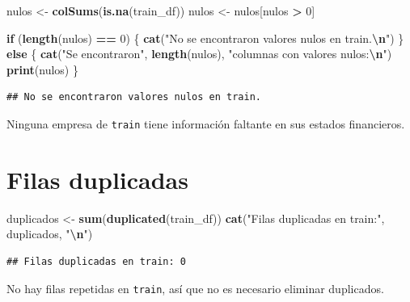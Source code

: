 \documentclass[
]{book}
\newenvironment{Shaded}{\begin{snugshade}}{\end{snugshade}}
\newcommand{\ControlFlowTok}[1]{\textcolor[rgb]{0.13,0.29,0.53}{\textbf{#1}}}
\newcommand{\DecValTok}[1]{\textcolor[rgb]{0.00,0.00,0.81}{#1}}
\newcommand{\FunctionTok}[1]{\textcolor[rgb]{0.13,0.29,0.53}{\textbf{#1}}}
\newcommand{\NormalTok}[1]{#1}
\newcommand{\OtherTok}[1]{\textcolor[rgb]{0.56,0.35,0.01}{#1}}
\newcommand{\SpecialCharTok}[1]{\textcolor[rgb]{0.81,0.36,0.00}{\textbf{#1}}}
\newcommand{\StringTok}[1]{\textcolor[rgb]{0.31,0.60,0.02}{#1}}
\begin{document}
\begin{Shaded}
\begin{Highlighting}[]
\NormalTok{nulos }\OtherTok{\textless{}{-}} \FunctionTok{colSums}\NormalTok{(}\FunctionTok{is.na}\NormalTok{(train\_df))}
\NormalTok{nulos }\OtherTok{\textless{}{-}}\NormalTok{ nulos[nulos }\SpecialCharTok{\textgreater{}} \DecValTok{0}\NormalTok{]}

\ControlFlowTok{if}\NormalTok{ (}\FunctionTok{length}\NormalTok{(nulos) }\SpecialCharTok{==} \DecValTok{0}\NormalTok{) \{}
  \FunctionTok{cat}\NormalTok{(}\StringTok{"No se encontraron valores nulos en train.}\SpecialCharTok{\textbackslash{}n}\StringTok{"}\NormalTok{)}
\NormalTok{\} }\ControlFlowTok{else}\NormalTok{ \{}
  \FunctionTok{cat}\NormalTok{(}\StringTok{"Se encontraron"}\NormalTok{, }\FunctionTok{length}\NormalTok{(nulos), }\StringTok{"columnas con valores nulos:}\SpecialCharTok{\textbackslash{}n}\StringTok{"}\NormalTok{)}
  \FunctionTok{print}\NormalTok{(nulos)}
\NormalTok{\}}
\end{Highlighting}
\end{Shaded}

\begin{verbatim}
## No se encontraron valores nulos en train.
\end{verbatim}

Ninguna empresa de \texttt{train} tiene información faltante en sus estados financieros.

\section{Filas duplicadas}\label{filas-duplicadas}

\begin{Shaded}
\begin{Highlighting}[]
\NormalTok{duplicados }\OtherTok{\textless{}{-}} \FunctionTok{sum}\NormalTok{(}\FunctionTok{duplicated}\NormalTok{(train\_df))}
\FunctionTok{cat}\NormalTok{(}\StringTok{"Filas duplicadas en train:"}\NormalTok{, duplicados, }\StringTok{"}\SpecialCharTok{\textbackslash{}n}\StringTok{"}\NormalTok{)}
\end{Highlighting}
\end{Shaded}

\begin{verbatim}
## Filas duplicadas en train: 0
\end{verbatim}

No hay filas repetidas en \texttt{train}, así que no es necesario eliminar duplicados.
\end{document}
